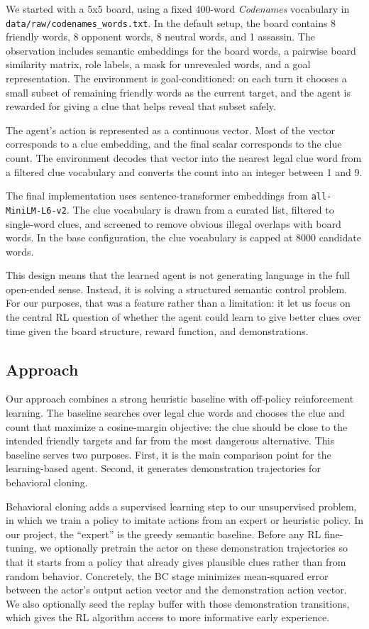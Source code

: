 \documentclass[9pt]{article}
\begin{document}
We started with a 5x5 board, using a fixed 400-word \emph{Codenames}
vocabulary in \texttt{data/raw/codenames\_words.txt}. In the default
setup, the board contains 8 friendly words, 8 opponent words, 8 neutral
words, and 1 assassin. The observation includes semantic embeddings for
the board words, a pairwise board similarity matrix, role labels, a mask
for unrevealed words, and a goal representation. The environment is
goal-conditioned: on each turn it chooses a small subset of remaining
friendly words as the current target, and the agent is rewarded for
giving a clue that helps reveal that subset safely.

The agent's action is represented as a continuous vector. Most of the
vector corresponds to a clue embedding, and the final scalar corresponds
to the clue count. The environment decodes that vector into the nearest
legal clue word from a filtered clue vocabulary and converts the count
into an integer between 1 and 9.

The final implementation uses sentence-transformer embeddings from
\texttt{all-MiniLM-L6-v2}. The clue vocabulary is drawn from a curated
list, filtered to single-word clues, and screened to remove obvious
illegal overlaps with board words. In the base configuration, the clue
vocabulary is capped at 8000 candidate words.

This design means that the learned agent is not generating language in
the full open-ended sense. Instead, it is solving a structured semantic
control problem. For our purposes, that was a feature rather than a
limitation: it let us focus on the central RL question of whether the
agent could learn to give better clues over time given the board
structure, reward function, and demonstrations.

\subsection{Approach}\label{approach}

Our approach combines a strong heuristic baseline with off-policy
reinforcement learning. The baseline searches over legal clue words and
chooses the clue and count that maximize a cosine-margin objective: the
clue should be close to the intended friendly targets and far from the
most dangerous alternative. This baseline serves two purposes. First, it
is the main comparison point for the learning-based agent. Second, it
generates demonstration trajectories for behavioral cloning.

Behavioral cloning adds a supervised learning step to our unsupervised problem, in which we train a
policy to imitate actions from an expert or heuristic policy. In our
project, the ``expert'' is the greedy semantic baseline. Before any RL
fine-tuning, we optionally pretrain the actor on these demonstration
trajectories so that it starts from a policy that already gives
plausible clues rather than from random behavior. Concretely, the BC
stage minimizes mean-squared error between the actor's output action
vector and the demonstration action vector. We also optionally seed the
replay buffer with those demonstration transitions, which gives the RL
algorithm access to more informative early experience. 
\end{document}
